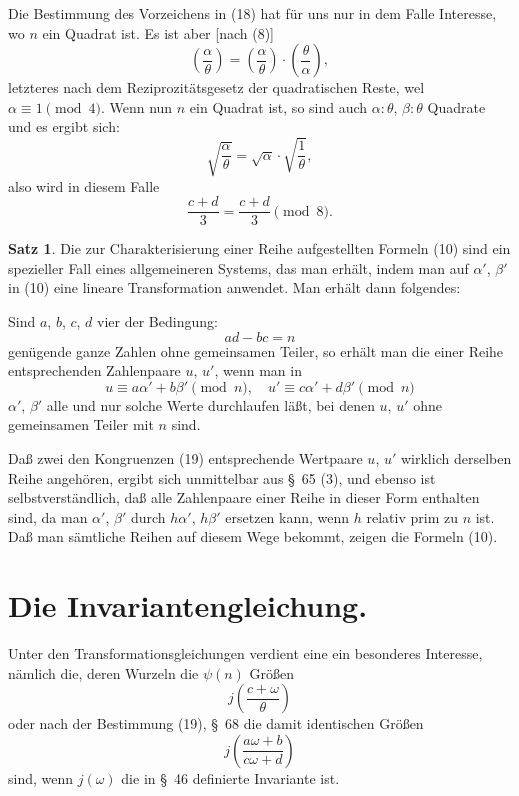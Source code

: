 \documentclass[12pt,a4paper]{article}
\theoremstyle{definition}
\newtheorem*{satz}{Satz}
\begin{document}
Die Bestimmung des Vorzeichens in (18) hat für uns nur in dem Falle Interesse, wo $n$ ein Quadrat ist. Es ist aber [nach (8)]
\[
\left(\frac{\alpha}{\theta}\right) = \left(\frac{\alpha}{\theta}\right) \cdot \left(\frac{\theta}{\alpha}\right),
\]
letzteres nach dem Reziprozitätsgesetz der quadratischen Reste, wel $\alpha \equiv 1 \pmod{4}$. Wenn nun $n$ ein Quadrat ist, so sind auch $\alpha:\theta$, $\beta:\theta$ Quadrate und es ergibt sich:
\[
\sqrt{\frac{\alpha}{\theta}} = \sqrt{\alpha} \cdot \sqrt{\frac{1}{\theta}},
\]
also wird in diesem Falle
\[
\frac{c + d}{3} = \frac{c + d}{3} \pmod{8}.
\]

\begin{satz}
Die zur Charakterisierung einer Reihe aufgestellten Formeln (10) sind ein spezieller Fall eines allgemeineren Systems, das man erhält, indem man auf $\alpha'$, $\beta'$ in (10) eine lineare Transformation anwendet. Man erhält dann folgendes:
\end{satz}


Sind $a$, $b$, $c$, $d$ vier der Bedingung:
\[
ad - bc = n
\]
genügende ganze Zahlen ohne gemeinsamen Teiler, so erhält man die einer Reihe entsprechenden Zahlenpaare $u$, $u'$, wenn man in
\begin{equation}\label{eq:68-19}
u \equiv a\alpha' + b\beta' \pmod{n}, \quad u' \equiv c\alpha' + d\beta' \pmod{n}
\end{equation}
$\alpha'$, $\beta'$ alle und nur solche Werte durchlaufen läßt, bei denen $u$, $u'$ ohne gemeinsamen Teiler mit $n$ sind.

Daß zwei den Kongruenzen (19) entsprechende Wertpaare $u$, $u'$ wirklich derselben Reihe angehören, ergibt sich unmittelbar aus \S\ 65 (3), und ebenso ist selbstverständlich, daß alle Zahlenpaare einer Reihe in dieser Form enthalten sind, da man $\alpha'$, $\beta'$ durch $h\alpha'$, $h\beta'$ ersetzen kann, wenn $h$ relativ prim zu $n$ ist. Daß man sämtliche Reihen auf diesem Wege bekommt, zeigen die Formeln (10).


\section{Die Invariantengleichung.}\label{sec:69}

Unter den Transformationsgleichungen verdient eine ein besonderes Interesse, nämlich die, deren Wurzeln die $\psi(n)$ Größen
\begin{equation}\label{eq:69-1}
j\left(\frac{c + \omega}{\theta}\right)
\end{equation}
oder nach der Bestimmung (19), \S\ 68 die damit identischen Größen
\begin{equation}\label{eq:69-2}
j\left(\frac{a\omega + b}{c\omega + d}\right)
\end{equation}
sind, wenn $j(\omega)$ die in \S\ 46 definierte Invariante ist.
\end{document}
